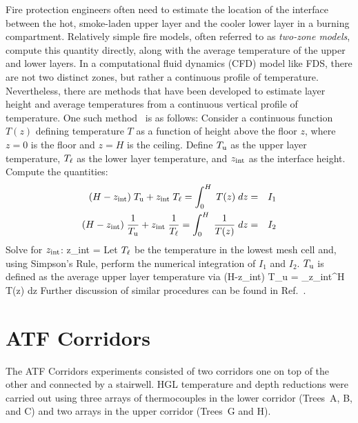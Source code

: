 Fire protection engineers often need to estimate the location of the interface between the hot, smoke-laden upper layer and the cooler lower layer in a burning compartment.  Relatively simple fire models, often referred to as {\em two-zone models}, compute this quantity directly, along with the average temperature of the upper and lower layers.  In a computational fluid dynamics (CFD) model like FDS, there are not two distinct zones, but rather a continuous profile of temperature. Nevertheless, there are methods that have been developed to estimate layer height and average temperatures from a continuous vertical profile of temperature. One such method~\cite{Janssens:JFS1992} is as follows: Consider a continuous function $T(z)$ defining temperature $T$ as a function of height above the floor $z$, where $z=0$ is the floor and $z=H$ is the ceiling. Define $T_{\rm u}$ as the upper layer temperature, $T_{\rm \ell}$ as the lower layer temperature, and $z_{\rm int}$ as the interface height. Compute the quantities:
\begin{eqnarray*} (H-z_{\rm int})\; T_{\rm u} + z_{\rm int} \; T_{\rm \ell} = \int_0^H \; T(z) \; dz &=& I_1 \\
                  (H-z_{\rm int})\; \frac{1}{T_{\rm u}} + z_{\rm int} \; \frac{1}{T_{\rm \ell}} = \int_0^H \; \frac{1}{T(z)} \; dz &=& I_2 \end{eqnarray*}
Solve for $z_{\rm int}$:
\be
   z_{\rm int} = 
\ee
Let $T_{\rm \ell}$ be the temperature in the lowest mesh cell and, using Simpson's Rule, perform the numerical integration of $I_1$ and $I_2$. $T_{\rm u}$ is defined as the average upper layer temperature via
\be
   (H-z_{\rm int})\; T_{\rm u} = \int_{z_{\rm int}}^H \; T(z) \; dz
\ee
Further discussion of similar procedures can be found in Ref.~\cite{He:1}.

\newpage


\section{ATF Corridors}

The ATF Corridors experiments consisted of two corridors one on top of the other and connected by a stairwell. HGL temperature and depth reductions were carried out using three arrays of thermocouples in the lower corridor (Trees~A, B, and C) and two arrays in the upper corridor (Trees~G and H).

